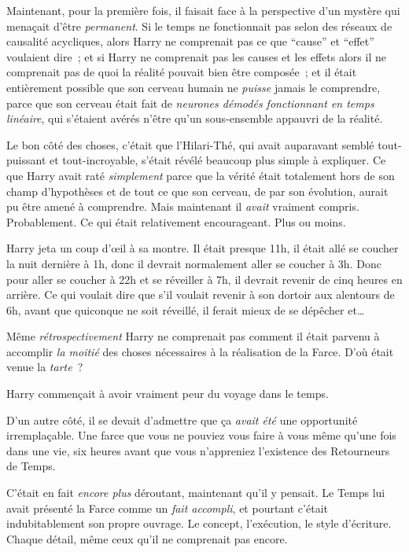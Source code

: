 Maintenant, pour la première fois, il faisait face à la perspective d'un mystère qui menaçait d'être \emph{permanent}. Si le temps ne fonctionnait pas selon des réseaux de causalité acycliques, alors Harry ne comprenait pas ce que “cause” et “effet” voulaient dire~; et si Harry ne comprenait pas les causes et les effets alors il ne comprenait pas de quoi la réalité pouvait bien être composée~; et il était entièrement possible que son cerveau humain ne \emph{puisse} jamais le comprendre, parce que son cerveau était fait de \emph{neurones démodés fonctionnant en temps linéaire}, qui s'étaient avérés n'être qu'un sous-ensemble appauvri de la réalité.

Le bon côté des choses, c'était que l'Hilari-Thé, qui avait auparavant semblé tout-puissant et tout-incroyable, s'était révélé beaucoup plus simple à expliquer. Ce que Harry avait raté \emph{simplement} parce que la vérité était totalement hors de son champ d'hypothèses et de tout ce que son cerveau, de par son évolution, aurait pu être amené à comprendre. Mais maintenant il \emph{avait} vraiment compris. Probablement. Ce qui était relativement encourageant. Plus ou moins.

Harry jeta un coup d'œil à sa montre. Il était presque 11h, il était allé se coucher la nuit dernière à 1h, donc il devrait normalement aller se coucher à 3h. Donc pour aller se coucher à 22h et se réveiller à 7h, il devrait revenir de cinq heures en arrière. Ce qui voulait dire que s'il voulait revenir à son dortoir aux alentours de 6h, avant que quiconque ne soit réveillé, il ferait mieux de se dépêcher et…

Même \emph{rétrospectivement} Harry ne comprenait pas comment il était parvenu à accomplir \emph{la moitié} des choses nécessaires à la réalisation de la Farce. D'où était venue la \emph{tarte}~?

Harry commençait à avoir vraiment peur du voyage dans le temps.

D'un autre côté, il se devait d'admettre que ça \emph{avait été} une opportunité irremplaçable. Une farce que vous ne pouviez vous faire à vous même qu'une fois dans une vie, six heures avant que vous n'appreniez l'existence des Retourneurs de Temps.

C'était en fait \emph{encore plus} déroutant, maintenant qu'il y pensait. Le Temps lui avait présenté la Farce comme un \emph{fait accompli}, et pourtant c'était indubitablement son propre ouvrage. Le concept, l'exécution, le style d'écriture. Chaque détail, même ceux qu'il ne comprenait pas encore.

